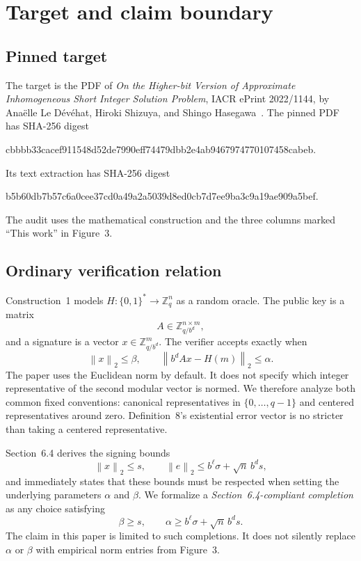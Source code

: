 \documentclass[10pt,a4paper]{article}
\newcommand{\Z}{\mathbb{Z}}
\newcommand{\norm}[1]{\left\lVert #1\right\rVert_2}
\begin{document}
\section{Target and claim boundary}

\subsection{Pinned target}

The target is the PDF of \emph{On the Higher-bit Version of Approximate
Inhomogeneous Short Integer Solution Problem}, IACR ePrint 2022/1144, by
Anaëlle Le Dévéhat, Hiroki Shizuya, and Shingo Hasegawa~\cite{hbaisis}. The
pinned PDF has SHA-256 digest
\begin{center}
\small\ttfamily
cbbbb33cacef911548d52de7990eff74479dbb2e4ab9467974770107458cabeb.
\end{center}
Its text extraction has SHA-256 digest
\begin{center}
\small\ttfamily
b5b60db7b57c6a0cee37cd0a49a2a5039d8ed0cb7d7ee9ba3c9a19ae909a5bef.
\end{center}
The audit uses the mathematical construction and the three columns marked
``This work'' in Figure~3.

\subsection{Ordinary verification relation}

Construction~1 models
$H:\{0,1\}^*\rightarrow\Z_q^n$ as a random oracle. The public key is a matrix
\[
  A\in\Z_{q/b^d}^{n\times m},
\]
and a signature is a vector $x\in\Z_{q/b^d}^{m}$. The verifier accepts exactly
when
\begin{equation}
  \norm{x}\leq\beta,
  \qquad
  \norm{b^dAx-H(m)}\leq\alpha.
  \label{eq:verify}
\end{equation}
The paper uses the Euclidean norm by default. It does not specify which
integer representative of the second modular vector is normed. We therefore
analyze both common fixed conventions: canonical representatives in
$\{0,\ldots,q-1\}$ and centered representatives around zero. Definition~8's
existential error vector is no stricter than taking a centered representative.

Section~6.4 derives the signing bounds
\begin{equation}
  \norm{x}\leq s,
  \qquad
  \norm{e}\leq b^\ell\sigma+\sqrt n\,b^d s,
  \label{eq:bounds}
\end{equation}
and immediately states that these bounds must be respected when setting the
underlying parameters $\alpha$ and $\beta$. We formalize a
\emph{Section~6.4-compliant completion} as any choice satisfying
\begin{equation}
  \beta\geq s,
  \qquad
  \alpha\geq b^\ell\sigma+\sqrt n\,b^d s.
  \label{eq:completion}
\end{equation}
The claim in this paper is limited to such completions. It does not silently
replace $\alpha$ or $\beta$ with empirical norm entries from Figure~3.
\end{document}
